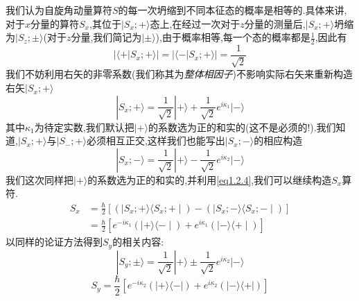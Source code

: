\documentclass[lang=cn,newtx,10pt,scheme=chinese,thmcnt=section]{elegantbook}
\begin{document}
我们认为自旋角动量算符$S$的每一次坍缩到不同本征态的概率是相等的.具体来讲,对于$x$分量的算符$S_x$,其位于$|S_x;+\rangle$态上,在经过一次对于$z$分量的测量后,$|S_x;+\rangle$坍缩为$|S_z;\pm\rangle$(对于$z$分量,我们简记为$|\pm\rangle$),由于概率相等,每一个态的概率都是$\frac12$,因此有
\begin{equation}
	|\langle+| S_x ; +\rangle|=|\langle-| S_x ; +\rangle|=\frac{1}{\sqrt{2}}
\end{equation}
我们不妨利用右矢的非零系数(我们称其为\textit{整体相因子})不影响实际右矢来重新构造右矢$|S_x;+\rangle$
\begin{equation}
	|S_x;+\rangle=\frac{1}{\sqrt{2}}|+\rangle+\frac{1}{\sqrt{2}}e^{i\kappa_1} |-\rangle 
\end{equation}
其中$\kappa_1$为待定实数,我们默认把$|+\rangle$的系数选为正的和实的(这不是必须的!).我们知道,$|S_x;+\rangle$与$|S_-;+\rangle$必须相互正交,这样我们也能写出$|S_x;-\rangle$的相应构造
\begin{equation}
	|S_x;-\rangle=\frac{1}{\sqrt{2}}|+\rangle-\frac{1}{\sqrt{2}}e^{i\kappa_2} |-\rangle 
\end{equation}
我们这次同样把$|+\rangle$的系数选为正的和实的,并利用\ref{eq1.2.4},我们可以继续构造$S_x$算符.
\begin{equation}
	\begin{aligned}S_{x}&=\frac{\hbar}{2}[(\mid S_{x} ; +\rangle\langle S_{x} ; +\mid)-(\mid S_{x} ; -\rangle\langle S_{x} ; -\mid) ]\\&=\frac{\hbar}{2}[e^{-i\kappa_{1}}\left(\mid+\rangle\langle-\mid\right)+e^{i\kappa_{1}}\left(\mid-\rangle\langle+\mid\right)]\end{aligned}
\end{equation}
以同样的论证方法得到$S_y$的相关内容:
\begin{equation}
	|S_{y};\pm\rangle=\frac{1}{\sqrt{2}}|+\rangle\pm\frac{1}{\sqrt{2}}e^{i\kappa_{2}} |-\rangle
\end{equation}
\begin{equation}
	S_{y}=\frac{\hbar}{2}[e^{-i\kappa_{2}}(|+\rangle\langle-|)+e^{i\kappa_{2}}(|-\rangle\langle+|)]
\end{equation}
\end{document}

